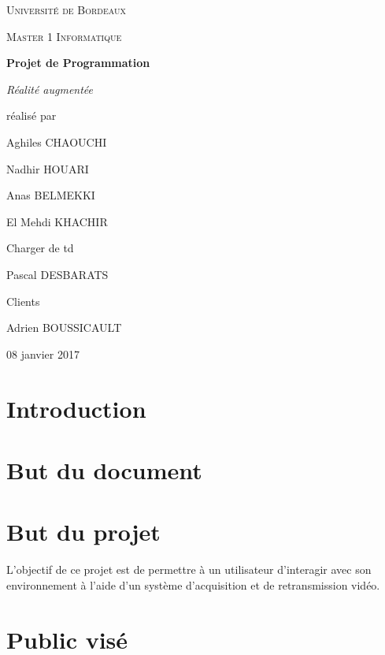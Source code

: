 \documentclass[12pt,a4paper]{article}
\begin{document}
\begin{titlepage}
\centering
{\scshape\LARGE Université de Bordeaux \par}
{\scshape\Large Master 1 Informatique \par}
\vspace{3cm}

{\Huge\bfseries Projet de Programmation \par}%
\vspace{0.5cm}
{\Large\itshape Réalité augmentée \par}

\vfill
réalisé par \par
Aghiles \textsc{CHAOUCHI} \par
Nadhir \textsc{HOUARI} \par
Anas \textsc{BELMEKKI} \par
El Mehdi \textsc{KHACHIR} \par \par
Charger de td \par
Pascal \textsc{DESBARATS} \par \par
Clients \par
Adrien \textsc{BOUSSICAULT} \par
\vfill

{\large 08 janvier 2017\par}

\end{titlepage}

\section{Introduction}

\section{But du document}

\section{But du projet}

L'objectif de ce projet est de permettre à un utilisateur d'interagir avec son environnement à l'aide d'un système d'acquisition et de retransmission vidéo.

\section{Public visé}
\end{document}
